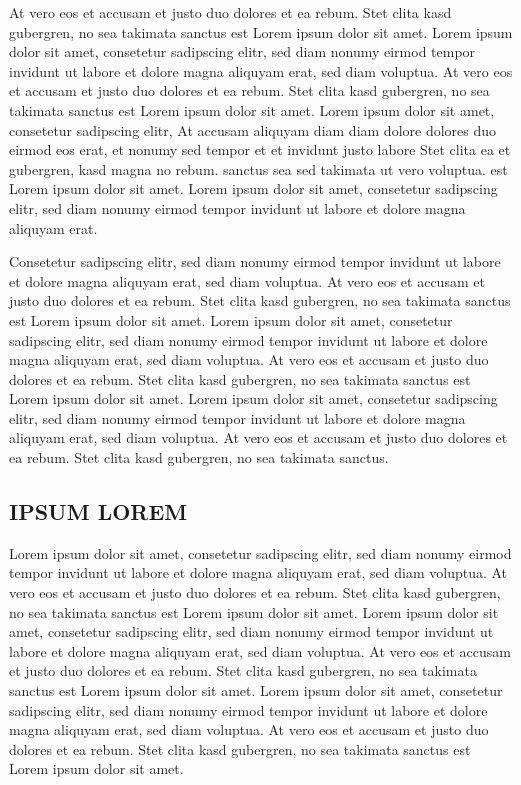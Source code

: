 \documentclass[]{../metanetpaper}
\begin{document}
At vero eos et accusam et justo duo dolores et ea rebum. Stet clita kasd gubergren, no sea takimata sanctus est Lorem ipsum dolor sit amet. Lorem ipsum dolor sit amet, consetetur sadipscing elitr, sed diam nonumy eirmod tempor invidunt ut labore et dolore magna aliquyam erat, sed diam voluptua. At vero eos et accusam et justo duo dolores et ea rebum. Stet clita kasd gubergren, no sea takimata sanctus est Lorem ipsum dolor sit amet. Lorem ipsum dolor sit amet, consetetur sadipscing elitr, At accusam aliquyam diam diam dolore dolores duo eirmod eos erat, et nonumy sed tempor et et invidunt justo labore Stet clita ea et gubergren, kasd magna no rebum. sanctus sea sed takimata ut vero voluptua. est Lorem ipsum dolor sit amet. Lorem ipsum dolor sit amet, consetetur sadipscing elitr, sed diam nonumy eirmod tempor invidunt ut labore et dolore magna aliquyam erat.   

Consetetur sadipscing elitr, sed diam nonumy eirmod tempor invidunt ut labore et dolore magna aliquyam erat, sed diam voluptua. At vero eos et accusam et justo duo dolores et ea rebum. Stet clita kasd gubergren, no sea takimata sanctus est Lorem ipsum dolor sit amet. Lorem ipsum dolor sit amet, consetetur sadipscing elitr, sed diam nonumy eirmod tempor invidunt ut labore et dolore magna aliquyam erat, sed diam voluptua. At vero eos et accusam et justo duo dolores et ea rebum. Stet clita kasd gubergren, no sea takimata sanctus est Lorem ipsum dolor sit amet. Lorem ipsum dolor sit amet, consetetur sadipscing elitr, sed diam nonumy eirmod tempor invidunt ut labore et dolore magna aliquyam erat, sed diam voluptua. At vero eos et accusam et justo duo dolores et ea rebum. Stet clita kasd gubergren, no sea takimata sanctus.   
\subsection{IPSUM LOREM}
Lorem ipsum dolor sit amet, consetetur sadipscing elitr, sed diam nonumy eirmod tempor invidunt ut labore et dolore magna aliquyam erat, sed diam voluptua. At vero eos et accusam et justo duo dolores et ea rebum. Stet clita kasd gubergren, no sea takimata sanctus est Lorem ipsum dolor sit amet. Lorem ipsum dolor sit amet, consetetur sadipscing elitr, sed diam nonumy eirmod tempor invidunt ut labore et dolore magna aliquyam erat, sed diam voluptua. At vero eos et accusam et justo duo dolores et ea rebum. Stet clita kasd gubergren, no sea takimata sanctus est Lorem ipsum dolor sit amet. Lorem ipsum dolor sit amet, consetetur sadipscing elitr, sed diam nonumy eirmod tempor invidunt ut labore et dolore magna aliquyam erat, sed diam voluptua. At vero eos et accusam et justo duo dolores et ea rebum. Stet clita kasd gubergren, no sea takimata sanctus est Lorem ipsum dolor sit amet.   
\end{document}
